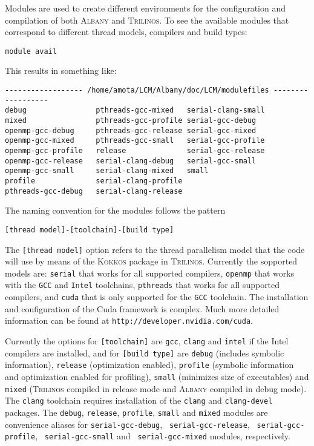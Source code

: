 \documentclass{article}
\newcommand{\trilinos}{\textsc{Trilinos}}
\newcommand{\albany}{\textsc{Albany}}
\newcommand{\kokkos}{\textsc{Kokkos}}
\begin{document}
Modules are used to create different environments for the
configuration and compilation of both \albany{} and \trilinos{}. To
see the available modules that correspond to different thread models,
compilers and build types:
\begin{verbatim}
module avail
\end{verbatim}
This results in something like:
\begin{verbatim}
------------------ /home/amota/LCM/Albany/doc/LCM/modulefiles ------------------
debug                pthreads-gcc-mixed   serial-clang-small
mixed                pthreads-gcc-profile serial-gcc-debug
openmp-gcc-debug     pthreads-gcc-release serial-gcc-mixed
openmp-gcc-mixed     pthreads-gcc-small   serial-gcc-profile
openmp-gcc-profile   release              serial-gcc-release
openmp-gcc-release   serial-clang-debug   serial-gcc-small
openmp-gcc-small     serial-clang-mixed   small
profile              serial-clang-profile
pthreads-gcc-debug   serial-clang-release
\end{verbatim}
The naming convention for the modules follows the pattern
\begin{verbatim}
[thread model]-[toolchain]-[build type]
\end{verbatim}
The \verb+[thread model]+ option refers to the thread parallelism
model that the code will use by means of the \kokkos{} package in
\trilinos{}. Currently the sopported models are: \verb+serial+ that
works for all supported compilers, \verb+openmp+ that works with the
\verb+GCC+ and \verb+Intel+ toolchains, \verb+pthreads+ that works for
all supported compilers, and \verb+cuda+ that is only supported for
the \verb+GCC+ toolchain. The installation and configuration of the
Cuda framework is complex. Much more detailed information can be found
at \verb+http://developer.nvidia.com/cuda+.

Currently the options for \verb+[toolchain]+ are \verb+gcc+,
\verb+clang+ and \verb+intel+ if the Intel compilers are installed,
and for \verb+[build type]+ are \verb+debug+ (includes symbolic
information), \verb+release+ (optimization enabled), \verb+profile+
(symbolic information and optimization enabled for profiling),
\verb+small+ (minimizes size of executables) and \verb+mixed+
(\trilinos{} compiled in release mode and \albany{} compiled in debug
mode). The \verb+clang+ toolchain requires installation of the
\verb+clang+ and \verb+clang-devel+ packages. The \verb+debug+,
\verb+release+, \verb+profile+, \verb+small+ and \verb+mixed+ modules
are convenience aliases for \verb+serial-gcc-debug+,
\verb+ serial-gcc-release+, \verb+ serial-gcc-profile+,
\verb+ serial-gcc-small+ and \verb+ serial-gcc-mixed+ modules,
respectively.
\end{document}
